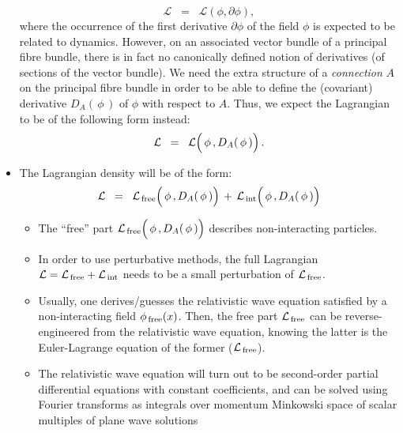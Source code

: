 \begin{itemize}
	\begin{equation*}
	\mathcal{L} \;\; = \;\; \mathcal{L}(\phi,\partial\phi),
	\end{equation*}
	where the occurrence of the first derivative $\partial\phi$ of the field $\phi$ is expected to be related to dynamics.
	\vskip 0.1cm
	However, on an associated vector bundle of a principal fibre bundle, there is in fact no canonically defined notion
	of derivatives (of sections of the vector bundle).
	We need the extra structure of a \textit{connection} $A$ on the principal fibre bundle
	in order to be able to define the (covariant) derivative $D_{A}(\,\phi\,)$ of $\phi$ with respect to $A$.
	Thus, we expect the Lagrangian to be of the following form instead:
	\begin{equation*}
	\mathcal{L} \;\; = \;\; \mathcal{L}\!\left(\,\overset{{\color{white}.}}{\phi}\,,D_{A}(\,\phi\,)\right).
	\end{equation*}
\item
	The Lagrangian density will be of the form:
	\begin{equation*}
	\mathcal{L}
	\;\; = \;\;
		\mathcal{L}_{\textnormal{\,free}}\!\left(\,\overset{{\color{white}.}}{\phi}\,,D_{A}(\,\phi\,)\right)
	\,+\,
		\mathcal{L}_{\textnormal{\,int}}\!\left(\,\overset{{\color{white}.}}{\phi}\,,D_{A}(\,\phi\,)\right)
	\end{equation*}
	\begin{itemize}
	\item
		The ``free'' part $\mathcal{L}_{\textnormal{\,free}}\!\left(\,\overset{{\color{white}.}}{\phi}\,,D_{A}(\,\phi\,)\right)$
		describes non-interacting particles.
	\item
		In order to use perturbative methods, the full Lagrangian
		$\mathcal{L} = \mathcal{L}_{\textnormal{\,free}} + \mathcal{L}_{\textnormal{\,int}}$
		needs to be a small perturbation of $\mathcal{L}_{\textnormal{\,free}}$.
	\item
		Usually, one derives/guesses the relativistic wave equation satisfied by a
		non-interacting field $\phi_{\,\textnormal{free}}(x)$.
		Then, the free part $\mathcal{L}_{\textnormal{\,free}}$ can be reverse-engineered
		from the relativistic wave equation, knowing the latter is the Euler-Lagrange equation
		of the former ($\mathcal{L}_{\textnormal{\,free}}$).
	\item
		The relativistic wave equation will turn out to be second-order partial differential equations
		with constant coefficients, and can be solved using Fourier transforms as integrals over
		momentum Minkowski space of scalar multiples of plane wave solutions

\end{itemize}
\end{itemize}
